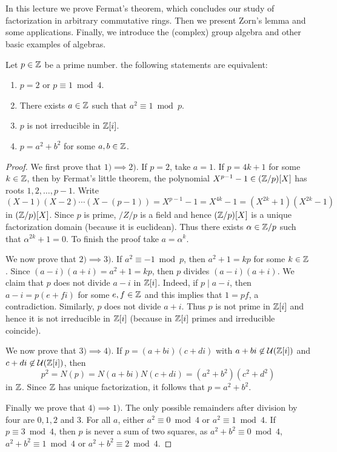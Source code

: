 \chapter{}

In this lecture we prove Fermat's theorem, which concludes our study of
factorization in arbitrary commutative rings. Then we present Zorn's lemma
and some applications. Finally, we introduce the (complex) group algebra and
other basic examples of algebras. 

\begin{theorem}[Fermat]
	Let $p\in\mathbb{Z}$ be a prime number. the following statements are equivalent:
	\begin{enumerate}
	    \item $p=2$ or $p\equiv1\bmod 4$.
	    \item There exists $a\in\mathbb{Z}$ such that $a^2\equiv1\bmod p$.
	    \item $p$ is not irreducible in $\mathbb{Z}[i]$.
	    \item $p=a^2+b^2$ for some $a,b\in\mathbb{Z}$.
	\end{enumerate}
\end{theorem}

\begin{proof}
    We first prove that $1)\implies 2)$. If $p=2$, take $a=1$. If $p=4k+1$ for some $k\in\mathbb{Z}$, then
    by Fermat's little theorem, the polynomial 
    $X^{p-1}-1\in(\mathbb{Z}/p)[X]$ has roots $1,2,\dots,p-1$. Write
    \[
    (X-1)(X-2)\cdots (X-(p-1))=X^{p-1}-1=X^{4k}-1=(X^{2k}+1)(X^{2k}-1)
    \]
    in $(\mathbb{Z}/p)[X]$. Since $p$ is prime, $/Z/p$ is a field and hence 
    $(\mathbb{Z}/p)[X]$ is a unique factorization domain (because it is euclidean). Thus 
    there exists $\alpha\in\mathbb{Z}/p$ such that $\alpha^{2k}+1=0$. To finish the proof
    take $a=\alpha^k$. 
    
    We now prove that $2)\implies 3)$. If $a^2\equiv-1\bmod p$, then $a^2+1=kp$ 
    for some $k\in\mathbb{Z}$. Since $(a-i)(a+i)=a^2+1=kp$, then $p$ divides $(a-i)(a+i)$. We 
    claim that $p$ does not divide $a-i$ in $\mathbb{Z}[i]$. Indeed, if $p\mid a-i$, then
    $a-i=p(e+fi)$ for some $e,f\in\mathbb{Z}$ and this implies that $1=pf$, a contradiction. Similarly,
    $p$ does not divide $a+i$. Thus $p$ is not prime in $\mathbb{Z}[i]$ 
    and hence it is not irreducible in $\mathbb{Z}[i]$ (because in $\mathbb{Z}[i]$ primes and irreducible coincide). 
    
    We now prove that $3)\implies 4)$. If $p=(a+bi)(c+di)$ with $a+bi\not\in\mathcal{U}(\mathbb{Z}[i])$
    and  $c+di\not\in\mathcal{U}(\mathbb{Z}[i])$, then
    \[
    p^2=N(p)=N(a+bi)N(c+di)=(a^2+b^2)(c^2+d^2)
    \]
    in $\mathbb{Z}$. Since $\mathbb{Z}$ has unique factorization, it follows that $p=a^2+b^2$. 
    
    Finally we prove that $4)\implies 1)$. 
    The only possible remainders after division by four are $0,1,2$ and $3$.  
    For all $a$, either $a^2\equiv 0\bmod 4$ or $a^2\equiv 1\bmod 4$. 
    If $p\equiv3\bmod 4$, then $p$ is never a sum of two squares, as 
    $a^2+b^2\equiv 0\bmod 4$, $a^2+b^2\equiv 1\bmod 4$ or $a^2+b^2\equiv 2\bmod 4$. 
\end{proof}

